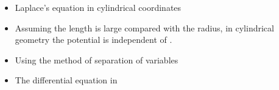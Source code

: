 \ELhold


\begin{ELunit}

\begin{itemize}
\tightlist
\item
  Laplace's equation in cylindrical coordinates
\end{itemize}


\begin{itemize}
\tightlist
\item
  Assuming the length is large compared with the radius, in cylindrical geometry the potential is independent of .
\end{itemize}


\begin{itemize}
\tightlist
\item
  Using the method of separation of variables
\end{itemize}


\end{ELunit}

\begin{ELjoin}

\begin{itemize}
\tightlist
\item
  The differential equation in \ELim{\phi}
\end{itemize}

\begin{ELimportant}{}


\end{ELimportant}

\end{ELjoin}

